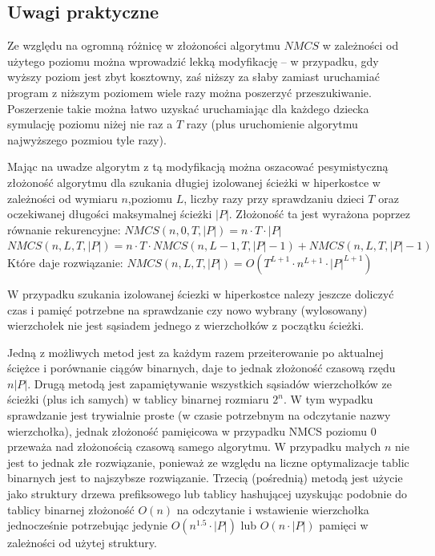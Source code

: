 \documentclass{pracamgr}
\begin{document}
    \subsection{Uwagi praktyczne}
     Ze względu na ogromną różnicę w złożoności algorytmu $NMCS$ w zależności od użytego poziomu można wprowadzić lekką modyfikację -- w przypadku,
     gdy wyższy poziom jest zbyt kosztowny, zaś niższy za słaby zamiast uruchamiać program z niższym poziomem wiele razy można poszerzyć przeszukiwanie.
     Poszerzenie takie można łatwo uzyskać uruchamiając dla każdego dziecka symulację poziomu niżej nie raz a $T$ razy
     (plus uruchomienie algorytmu najwyższego pozmiou tyle razy).
     
     Mając na uwadze algorytm z tą modyfikacją można oszacować pesymistyczną złożoność algorytmu dla szukania długiej izolowanej ścieżki w hiperkostce
     w zależności od wymiaru $n$,poziomu $L$, liczby razy przy sprawdzaniu dzieci $T$ oraz oczekiwanej długości maksymalnej ścieżki $|P|$.
     Złożoność ta jest wyrażona poprzez równanie rekurencyjne:\newline
     $NMCS(n,0,T,|P|)=n\cdot T\cdot |P|$\newline
     $NMCS(n,L,T,|P|)=n\cdot T\cdot NMCS(n,L-1,T,|P|-1)+NMCS(n,L,T,|P|-1)$\newline
     Które daje rozwiązanie:\newline
     $NMCS(n,L,T,|P|)=O(T^{L+1}\cdot n^{L+1}\cdot|P|^{L+1})$     
     
     W przypadku szukania izolowanej ściezki w hiperkostce nalezy jeszcze doliczyć czas i pamięć potrzebne na sprawdzanie czy nowo wybrany (wylosowany)
     wierzchołek nie jest sąsiadem jednego z wierzchołków z początku ścieżki.
     
     Jedną z możliwych metod jest za każdym razem przeiterowanie po aktualnej ściężce i porównanie ciągów binarnych, daje to jednak złożoność
     czasową rzędu $n |P|$. Drugą metodą jest zapamiętywanie wszystkich sąsiadów wierzchołków ze ścieżki (plus ich samych) w tablicy binarnej rozmiaru $2^n$.
     W tym wypadku sprawdzanie jest trywialnie proste (w czasie potrzebnym na odczytanie nazwy wierzchołka),
     jednak złożoność pamięicowa w przypadku NMCS poziomu $0$ przeważa nad złożonością czasową samego algorytmu.
     W przypadku małych $n$ nie jest to jednak złe rozwiązanie, ponieważ ze względu na liczne optymalizacje tablic binarnych jest to najszybsze rozwiązanie.
     Trzecią (pośrednią) metodą jest użycie jako struktury drzewa prefiksowego lub tablicy hashującej uzyskując podobnie do tablicy binarnej%
     złożoność $O(n)$ na odczytanie i wstawienie wierzchołka jednocześnie potrzebując jedynie $O(n^{1.5}\cdot|P|)$ lub $O(n\cdot|P|)$ pamięci w zależności od użytej struktury.
     
\end{document}
